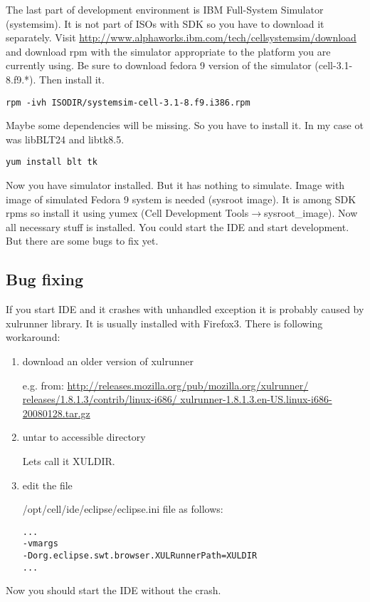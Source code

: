 The last part of development environment is IBM Full-System Simulator (systemsim).
It is not part of ISOs with SDK so you have to download it separately.
Visit \url{http://www.alphaworks.ibm.com/tech/cellsystemsim/download} and download rpm with the simulator appropriate to the platform you are currently using.
Be sure to download fedora 9 version of the simulator (cell-3.1-8.f9.*). Then install it.

\begin{verbatim}
rpm -ivh ISODIR/systemsim-cell-3.1-8.f9.i386.rpm
\end{verbatim}

Maybe some dependencies will be missing. So you have to install it. In my case ot was libBLT24 and libtk8.5.

\begin{verbatim}
yum install blt tk
\end{verbatim}

Now you have simulator installed. But it has nothing to simulate.
Image with image of simulated Fedora 9 system is needed (sysroot image).
It is among SDK rpms so install it using yumex (Cell Development Tools$\rightarrow$sysroot\_image).
Now all necessary stuff is installed.
You could start the IDE and start development. But there are some bugs to fix yet.

\subsection{Bug fixing}

If you start IDE and it crashes with unhandled exception it is probably caused by xulrunner library.
It is usually installed with Firefox3. There is following workaround:
\begin{enumerate}
\item download an older version of xulrunner

e.g. from: \url{http://releases.mozilla.org/pub/mozilla.org/xulrunner/ releases/1.8.1.3/contrib/linux-i686/ xulrunner-1.8.1.3.en-US.linux-i686-20080128.tar.gz}

\item untar to accessible directory

Lets call it XULDIR.

\item edit the file

/opt/cell/ide/eclipse/eclipse.ini file as follows:
\label{XULLFIX}
\begin{verbatim}
...
-vmargs
-Dorg.eclipse.swt.browser.XULRunnerPath=XULDIR
...
\end{verbatim}
\end{enumerate}
Now you should start the IDE without the crash.

